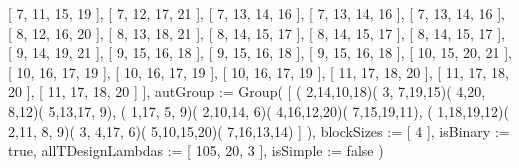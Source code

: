       [ 7, 11, 15, 19 ], [ 7, 12, 17, 21 ], [ 7, 13, 14, 16 ], 
      [ 7, 13, 14, 16 ], [ 7, 13, 14, 16 ], [ 8, 12, 16, 20 ], 
      [ 8, 13, 18, 21 ], [ 8, 14, 15, 17 ], [ 8, 14, 15, 17 ], 
      [ 8, 14, 15, 17 ], [ 9, 14, 19, 21 ], [ 9, 15, 16, 18 ], 
      [ 9, 15, 16, 18 ], [ 9, 15, 16, 18 ], [ 10, 15, 20, 21 ], 
      [ 10, 16, 17, 19 ], [ 10, 16, 17, 19 ], [ 10, 16, 17, 19 ], 
      [ 11, 17, 18, 20 ], [ 11, 17, 18, 20 ], [ 11, 17, 18, 20 ] ],
  autGroup := Group( [ ( 2,14,10,18)( 3, 7,19,15)( 4,20, 8,12)( 5,13,17, 9), 
      ( 1,17, 5, 9)( 2,10,14, 6)( 4,16,12,20)( 7,15,19,11), 
      ( 1,18,19,12)( 2,11, 8, 9)( 3, 4,17, 6)( 5,10,15,20)( 7,16,13,14) ] ),
  blockSizes := [ 4 ],
  isBinary := true,
  allTDesignLambdas := [ 105, 20, 3 ],
  isSimple := false )
\endexample
